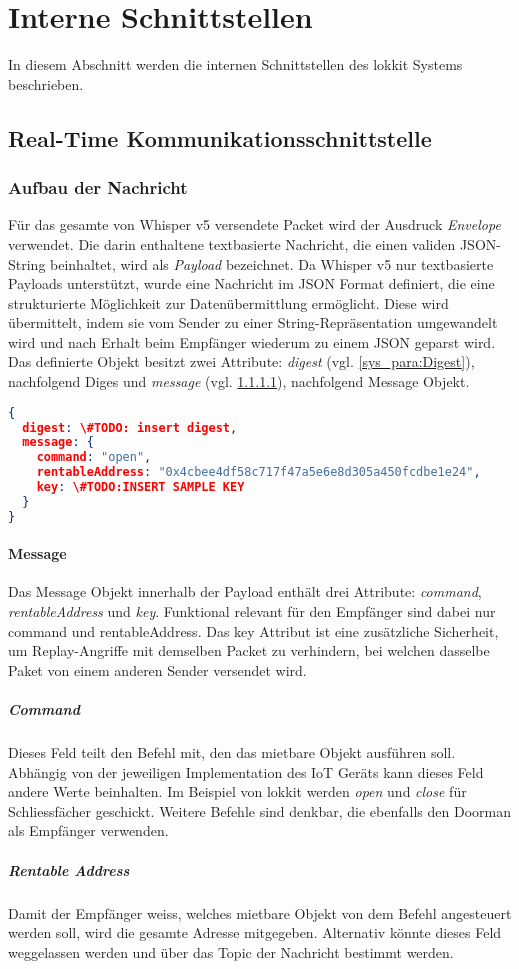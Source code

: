 \section{Interne Schnittstellen}
In diesem Abschnitt werden die internen Schnittstellen des lokkit Systems beschrieben.

\subsection{Real-Time Kommunikationsschnittstelle}
\label{sys_subsec:Real_Time_Kommunikationsschnittstelle}

\subsubsection{Aufbau der Nachricht}
Für das gesamte von Whisper v5 versendete Packet wird der Ausdruck \emph{Envelope} verwendet. Die darin enthaltene textbasierte Nachricht, die einen validen JSON-String beinhaltet, wird als \emph{Payload} bezeichnet. Da Whisper v5 nur textbasierte Payloads unterstützt, wurde eine Nachricht im \acrshort{JSON} Format definiert, die eine strukturierte Möglichkeit zur Datenübermittlung ermöglicht. Diese wird übermittelt, indem sie vom Sender zu einer String-Repräsentation umgewandelt wird und nach Erhalt beim Empfänger wiederum zu einem JSON geparst wird. Das definierte Objekt besitzt zwei Attribute: \emph{digest} (vgl. \ref{sys_para:Digest}), nachfolgend Diges und \emph{message} (vgl. \ref{sys_para:Message}), nachfolgend Message Objekt. 

\begin{lstlisting}[language=json,caption={Beispiel einer lokkit JSON Nachricht}]
{
  digest: \#TODO: insert digest,
  message: {
    command: "open",
    rentableAddress: "0x4cbee4df58c717f47a5e6e8d305a450fcdbe1e24",
    key: \#TODO:INSERT SAMPLE KEY
  }
}
\end{lstlisting}

\paragraph{Message}
\label{sys_para:Message}
Das Message Objekt innerhalb der Payload enthält drei Attribute: \emph{command}, \emph{rentableAddress} und \emph{key}. Funktional relevant für den Empfänger sind dabei nur command und rentableAddress. Das key Attribut ist eine zusätzliche Sicherheit, um Replay-Angriffe mit demselben Packet zu verhindern, bei welchen dasselbe Paket von einem anderen Sender versendet wird.
\subparagraph{Command}
\label{sys_subpara:Command}
Dieses Feld teilt den Befehl mit, den das mietbare Objekt ausführen soll. Abhängig von der jeweiligen Implementation des IoT Geräts kann dieses Feld andere Werte beinhalten. Im Beispiel von lokkit werden \emph{open} und \emph{close} für Schliessfächer geschickt. Weitere Befehle sind denkbar, die ebenfalls den Doorman als Empfänger verwenden.
\subparagraph{Rentable Address}
Damit der Empfänger weiss, welches mietbare Objekt von dem Befehl angesteuert werden soll, wird die gesamte Adresse mitgegeben. Alternativ könnte dieses Feld weggelassen werden und über das Topic der Nachricht bestimmt werden.

